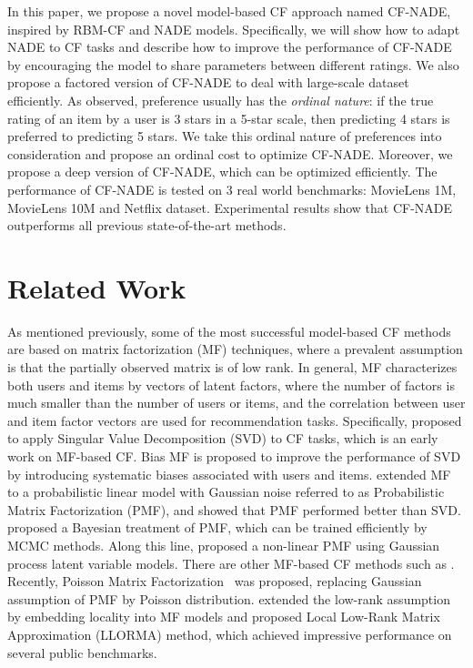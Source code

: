 \documentclass{article}
\newcommand{\cfnade}{CF-NADE\xspace}
\begin{document}
  In this paper, we propose a novel model-based CF approach named
  \cfnade, inspired by RBM-CF and NADE models. Specifically, we will
  show how to adapt NADE to CF tasks and describe how to improve the
  performance of \cfnade by encouraging the model to share parameters
  between different ratings. We also propose a factored version of
  \cfnade to deal with large-scale dataset efficiently. As
  \citet{phung2009ordinal} observed, preference usually has the
  \emph{ordinal nature}: if the true rating of an item by a user is 3
  stars in a 5-star scale, then predicting 4 stars is preferred to
  predicting 5 stars. We take this ordinal nature of preferences into
  consideration and propose an ordinal cost to optimize
  \cfnade. Moreover, we propose a deep version of \cfnade, which can
  be optimized efficiently. The performance of \cfnade is tested on
  $3$ real world benchmarks: MovieLens 1M, MovieLens 10M and Netflix
  dataset. Experimental results show that \cfnade outperforms all previous
  state-of-the-art methods.







\section{Related Work}
\label{sec:related_work}

As mentioned previously, some of the most successful model-based CF
methods are based on matrix factorization (MF) techniques, where a
prevalent assumption is that the partially observed matrix is of low
rank. In general, MF characterizes both users and items by
vectors of latent factors, where the number of factors is much smaller
than the number of users or items, and the correlation between user
and item factor vectors are used for recommendation
tasks. Specifically, \citet{billsus1998learning} proposed to apply
Singular Value Decomposition (SVD) to CF tasks, which is an early work
on MF-based CF. Bias MF \cite{koren2009matrix} is proposed to improve
the performance of SVD by introducing systematic biases associated
with users and items. \citet{mnih2007probabilistic} extended MF to a
probabilistic linear model with Gaussian noise referred to as
Probabilistic Matrix Factorization (PMF), and showed that PMF
performed better than SVD. \citet{salakhutdinov2008bayesian} proposed
a Bayesian treatment of PMF, which can be trained efficiently by MCMC
methods. Along this line, \citet{lawrence2009non} proposed a non-linear
PMF using Gaussian process latent variable models. There are other
MF-based CF methods such as
\citep{rennie2005fast,mackey2011divide}. Recently, Poisson Matrix
Factorization~\citep{gopalan2014content,gopalan2014bayesian,gopalan2013scalable}
was proposed, replacing Gaussian assumption of PMF by Poisson
distribution. \citet{lee2013local} extended the low-rank assumption by
embedding locality into MF models and proposed Local Low-Rank Matrix
Approximation (LLORMA) method, which achieved impressive performance on several public benchmarks.
\end{document}
